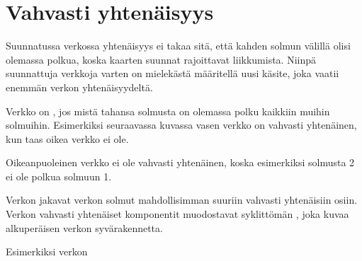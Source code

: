 \chapter{Vahvasti yhtenäisyys}


Suunnatussa verkossa yhtenäisyys ei takaa sitä,
että kahden solmun välillä olisi olemassa polkua,
koska kaarten suunnat rajoittavat liikkumista.
Niinpä suunnattuja verkkoja varten on mielekästä
määritellä uusi käsite,
joka vaatii enemmän verkon yhtenäisyydeltä.

Verkko on ,
jos mistä tahansa solmusta on olemassa polku
kaikkiin muihin solmuihin.
Esimerkiksi seuraavassa kuvassa vasen
verkko on vahvasti yhtenäinen,
kun taas oikea verkko ei ole.

\begin{center}
\end{center}

Oikeanpuoleinen verkko ei ole vahvasti yhtenäinen,
koska esimerkiksi solmusta 2 ei ole
polkua solmuun 1.


Verkon 
jakavat verkon solmut mahdollisimman
suuriin vahvasti yhtenäisiin osiin.
Verkon vahvasti yhtenäiset komponentit
muodostavat syklittömän ,
joka kuvaa alkuperäisen verkon syvärakennetta.

Esimerkiksi verkon

